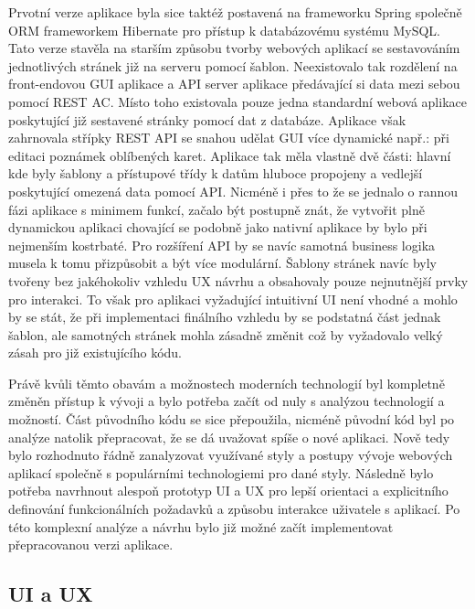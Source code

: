 \begin{itemize}
\begin{itemize}
	Prvotní verze aplikace byla sice taktéž postavená na frameworku Spring společně \ac{ORM} frameworkem Hibernate pro
	přístup k databázovému systému MySQL.
	Tato verze stavěla na starším způsobu tvorby webových aplikací se sestavováním jednotlivých stránek již na serveru pomocí
	šablon.
	Neexistovalo tak rozdělení na front-endovou \ac{GUI} aplikace a \ac{API} server aplikace předávající si data mezi sebou
	pomocí \ac{REST} \ac{AC}.
	Místo toho existovala pouze jedna standardní webová aplikace poskytující již sestavené stránky pomocí dat z databáze.
	Aplikace však zahrnovala střípky \ac{REST} \ac{API} se snahou udělat \ac{GUI} více dynamické např.: při editaci poznámek
	oblíbených karet.
	Aplikace tak měla vlastně dvě části: hlavní kde byly šablony a přístupové třídy k datům hluboce propojeny a vedlejší
	poskytující omezená data pomocí \ac{API}.
	Nicméně i přes to že se jednalo o rannou fázi aplikace s minimem funkcí, začalo být postupně znát, že vytvořit
	plně dynamickou aplikaci chovající se podobně jako nativní aplikace by bylo při nejmenším kostrbaté.
	Pro rozšíření \ac{API} by se navíc samotná business logika musela k tomu přizpůsobit a být více modulární.
	Šablony stránek navíc byly tvořeny bez jakéhokoliv vzhledu \ac{UX} návrhu a obsahovaly pouze nejnutnější prvky pro
	interakci.
	To však pro aplikaci vyžadující intuitivní \ac{UI} není vhodné a mohlo by se stát, že při implementaci finálního vzhledu
	by se podstatná část jednak šablon, ale samotných stránek mohla zásadně změnit což by vyžadovalo velký zásah pro již
	existujícího kódu.

	Právě kvůli těmto obavám a možnostech moderních technologií byl kompletně změněn přístup k vývoji a bylo potřeba začít
	od nuly s analýzou technologií a možností.
	Část původního kódu se sice přepoužila, nicméně původní kód byl po analýze natolik přepracovat, že se dá uvažovat
	spíše o nové aplikaci.
	Nově tedy bylo rozhodnuto řádně zanalyzovat využívané styly a postupy vývoje webových aplikací společně s populárními
	technologiemi pro dané styly.
	Následně bylo potřeba navrhnout alespoň prototyp \ac{UI} a \ac{UX} pro lepší orientaci a explicitního definování
	funkcionálních požadavků a způsobu interakce uživatele s aplikací.
	Po této komplexní analýze a návrhu bylo již možné začít implementovat přepracovanou verzi aplikace.

	\subsection{UI a UX}


\end{itemize}
\end{itemize}
